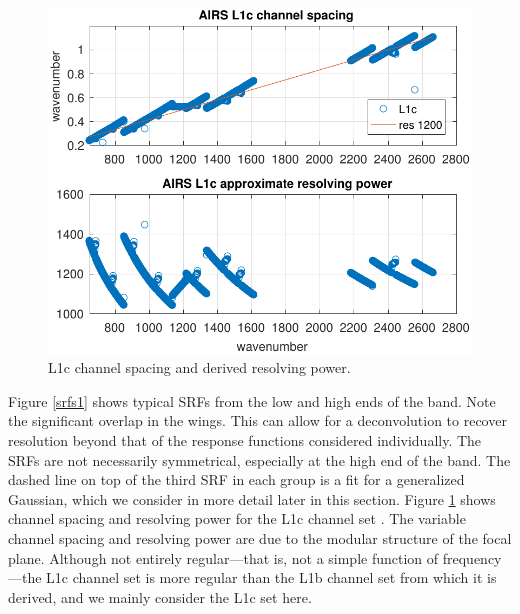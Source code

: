 \documentclass[10pt,twocolumn]{article}  %
\begin{document}
\begin{figure} %
  \centering
  \includegraphics[width=\linewidth]{figures/airs_L1c_res.pdf}
  \caption{{\airs} L1c channel spacing and derived resolving
    power.}
  \label{chan1}
\end{figure}

Figure \ref{srfs1} shows typical {\airs} SRFs from the low and high
ends of the band.  Note the significant overlap in the wings.  This
can allow for a deconvolution to recover resolution beyond that of
the response functions considered individually.  The SRFs are not
necessarily symmetrical, especially at the high end of the band.
The dashed line on top of the third SRF in each group is a fit for a
generalized Gaussian, which we consider in more detail later in this
section.  Figure \ref{chan1} shows channel spacing and resolving
power for the {\airs} L1c channel set \cite{a1c:atbd}.  The variable
channel spacing and resolving power are due to the modular structure
of the focal plane.  Although not entirely regular---that is, not a
simple function of frequency---the L1c channel set is more regular
than the L1b channel set from which it is derived, and we mainly
consider the L1c set here.
\end{document}
